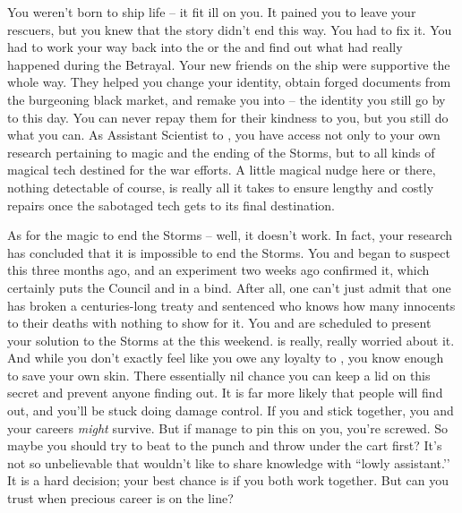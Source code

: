 \documentclass[char]{GL2020}
\begin{document}
You weren't born to ship life -- it fit ill on you. It pained you to leave your rescuers, but you knew that the story didn't end this way. You had to fix it. You had to work your way back into the \pFarm{} or the \pTech{} and find out what had really happened during the Betrayal. Your new friends on the \cSavFlet{\full} ship were supportive the whole way. They helped you change your identity, obtain forged documents from the burgeoning black market, and remake you into \cAssistantScientist{\full} -- the identity you still go by to this day. You can never repay them for their kindness to you, but you still do what you can. As Assistant Scientist to \cHeadScientist{\full}, you have access not only to your own research pertaining to magic and the ending of the Storms, but to all kinds of magical tech destined for the war efforts. A little magical nudge here or there, nothing detectable of course, is really all it takes to ensure lengthy and costly repairs once the sabotaged tech gets to its final destination.

As for the magic to end the Storms -- well, it doesn't work. In fact, your research has concluded that it is impossible to end the Storms. You and \cHeadScientist{} began to suspect this three months ago, and an experiment two weeks ago confirmed it, which certainly puts the Council and \cHeadScientist{} in a bind. After all, one can't just admit that one has broken a centuries-long treaty and sentenced who knows how many innocents to their deaths with nothing to show for it. You and \cHeadScientist{} are scheduled to present your solution to the Storms at the \pSc{} this weekend. \cHeadScientist{} is really, really worried about it. And while you don't exactly feel like you owe any loyalty to \cHeadScientist{\them}, you know enough to save your own skin. There essentially nil chance you can keep a lid on this secret and prevent anyone finding out. It is far more likely that people will find out, and you'll be stuck doing damage control. If you and \cHeadScientist{} stick together, you and your careers \emph{might} survive. But if \cHeadScientist{\they} manage\cHeadScientist{\plural} to pin this on you, you're screwed. So maybe you should try to beat \cHeadScientist{\them} to the punch and throw \cHeadScientist{\them} under the cart first? It's not so unbelievable that  \cHeadScientist{} wouldn't like to share knowledge with \cHeadScientist{\their} ``lowly assistant.'’ It is a hard decision; your best chance is if you both work together. But can you trust \cHeadScientist{} when \cHeadScientist{\their} precious career is on the line?
\end{document}
